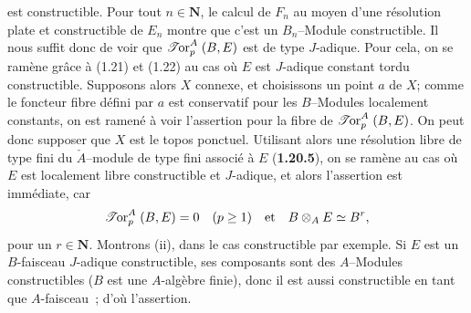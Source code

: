 est constructible. Pour tout $n \in \mathbf{N}$, le calcul de $F_n$ au moyen d'une résolution plate et constructible de $E_n$ montre que c'est un $B_n$--Module constructible. Il nous suffit donc de voir que $\mathrel{\mathscr{T}\mkern-2mu\text{\upshape or}}^A_p(B, E)$ est de type $J$-adique. Pour cela, on se ramène grâce à (1.21) et (1.22) au cas où $E$ est $J$-adique constant tordu constructible. Supposons alors $X$ connexe, et choisissons un point $a$ de $X$; comme le foncteur fibre défini par $a$ est conservatif pour les $B$--Modules localement constants, on est ramené à voir l'assertion pour la fibre de $\mathrel{\mathscr{T}\mkern-2mu\text{\upshape or}}^A_p(B, E)$. On peut donc supposer que $X$ est le topos ponctuel. Utilisant alors une résolution libre de type fini du $\check{A}$--module de type fini associé à $E$ ({\bf 1.20.5}), on se ramène au cas où $E$ est localement libre constructible et $J$-adique, et alors l'assertion est immédiate, car
$$
\mathrel{\mathscr{T}\mkern-2mu\text{\upshape or}}^A_p(B, E) = 0 \quad (p \geq 1) \quad \text{et} \quad B \otimes_A E \simeq B^r,
$$
pour un $r \in \mathbf{N}$. Montrons (ii), dans le cas constructible par exemple. Si $E$ est un $B$-faisceau $J$-adique constructible, ses composants sont des $A$--Modules constructibles ($B$ est une $A$-algèbre finie), donc il est aussi constructible en tant que $A$-faisceau~; d'où l'assertion.

